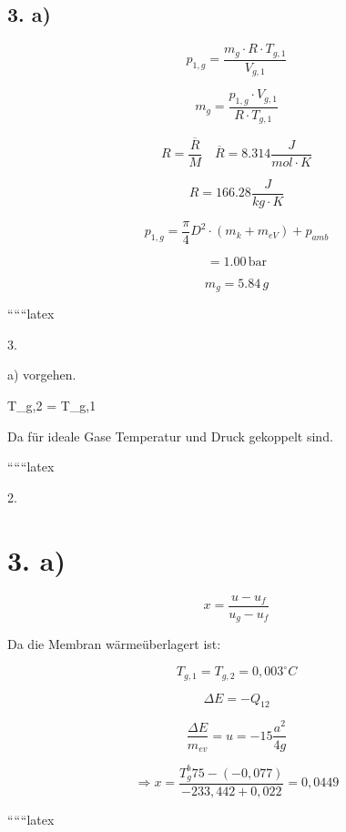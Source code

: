 \subsection*{3. a)}

\begin{equation*}
    p_{1,g} = \frac{m_g \cdot R \cdot T_{g,1}}{V_{g,1}}
\end{equation*}

\begin{equation*}
    m_g = \frac{p_{1,g} \cdot V_{g,1}}{R \cdot T_{g,1}}
\end{equation*}

\begin{equation*}
    R = \frac{\overline{R}}{M} \quad \overline{R} = 8.314 \frac{J}{mol \cdot K}
\end{equation*}

\begin{equation*}
    R = 166.28 \frac{J}{kg \cdot K}
\end{equation*}

\begin{equation*}
    p_{1,g} = \frac{\pi}{4} D^2 \cdot (m_k + m_{eV}) + p_{amb}
\end{equation*}

\begin{equation*}
    = 1.00 \, \text{bar}
\end{equation*}

\begin{equation*}
    m_g = 5.84 \, g
\end{equation*}

``````latex


3.

a) vorgehen.

T_{g,2} = T_{g,1}

Da für ideale Gase Temperatur und Druck gekoppelt sind.

``````latex


2.

\section*{3. a)}

\begin{equation*}
    x = \frac{u - u_f}{u_g - u_f}
\end{equation*}

Da die Membran wärmeüberlagert ist:

\begin{equation*}
    T_{g,1} = T_{g,2} = 0,003^\circ C
\end{equation*}

\begin{equation*}
    \Delta E = -Q_{12}
\end{equation*}

\begin{equation*}
    \frac{\Delta E}{m_{ev}} = u = -15 \frac{a^2}{4g}
\end{equation*}

\begin{equation*}
    \Rightarrow x = \frac{T_{g}^b 75 - (-0,077)}{-233,442 + 0,022} = 0,0449
\end{equation*}

``````latex